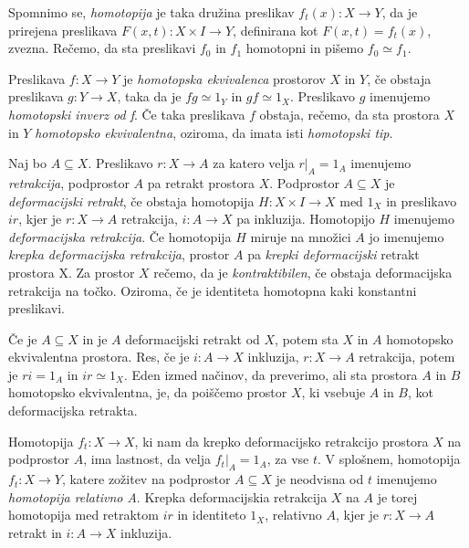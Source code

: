 \documentclass[mat1]{fmfdelo}
\begin{document}
Spomnimo se, \textit{homotopija} je taka družina preslikav $f_t(x):X \rightarrow Y$, da je prirejena preslikava $F(x,t):X \times I \rightarrow Y$, definirana kot $F(x,t)=f_t(x)$, zvezna. Rečemo, da sta preslikavi $f_0$ in $f_1$ homotopni in pišemo $f_0 \simeq f_1$.


\begin{definicija}
    Preslikava  $f : X \rightarrow Y$ je \textit{homotopska ekvivalenca} prostorov $X$ in $Y$, če obstaja preslikava $g: Y\rightarrow X$, taka da
    je $f g \simeq 1_Y$ in $gf \simeq 1_X$. Preslikavo $g$ imenujemo \textit{homotopski inverz od f}. Če taka preslikava $f$ obstaja, rečemo, da sta prostora $X$ in
    $Y$  \textit{homotopsko ekvivalentna}, oziroma, da imata isti \textit{homotopski tip}.
\end{definicija}

\begin{definicija}
    Naj bo $A \subseteq X$. Preslikavo $r : X \rightarrow A$ za katero 
    velja $r|_A = 1_A$ imenujemo \textit{retrakcija}, podprostor
     $A$ pa retrakt prostora $X$. Podprostor $A \subseteq X$ je 
     \textit{deformacijski retrakt}, če obstaja homotopija $H : X \times
      I \rightarrow X$ med $1_X$ in preslikavo $ir$, kjer je $r : X 
      \rightarrow A$ retrakcija, $i:A\rightarrow X$ pa inkluzija. Homotopijo $H$ imenujemo \textit{deformacijska 
      retrakcija}. Če homotopija $H$ miruje na množici $A$ jo imenujemo 
      \textit{krepka deformacijska retrakcija}, prostor $A$ pa 
      \textit{krepki deformacijski} retrakt prostora X. Za prostor $X$ rečemo, da je \textit{kontraktibilen}, če obstaja deformacijska retrakcija na točko. Oziroma, če je identiteta homotopna kaki konstantni preslikavi.
\end{definicija}

Če je $A\subseteq X$ in je $A$ deformacijski retrakt od $X$, potem sta 
$X$ in $A$ homotopsko ekvivalentna prostora. Res, če je $i:A\rightarrow
 X$ inkluzija, $r:X\rightarrow A$ retrakcija, potem je $ri=1_A$
  in $ir\simeq1_X$. Eden izmed načinov, da preverimo, ali sta
   prostora $A$ in $B$ homotopsko ekvivalentna, je, da poiščemo prostor
    $X$, ki vsebuje $A$ in $B$, kot deformacijska retrakta. 

Homotopija $f_t: X\rightarrow X$, ki nam da krepko deformacijsko retrakcijo 
prostora $X$ na podprostor $A$, ima lastnost, da velja 
$f_t|_A=1_A$, za vse $t$. V splošnem, homotopija 
$f_t:X\rightarrow Y$, katere zožitev na podprostor $A\subseteq X$ je 
neodvisna od $t$ imenujemo \textit{homotopija relativno A}. Krepka 
deformacijskia retrakcija $X$ na $A$ je torej homotopija med retraktom
 $ir$ in identiteto $1_X$, relativno $A$, kjer je $r:X\rightarrow A$ retrakt in $i:A\rightarrow X$ inkluzija.
\end{document}
